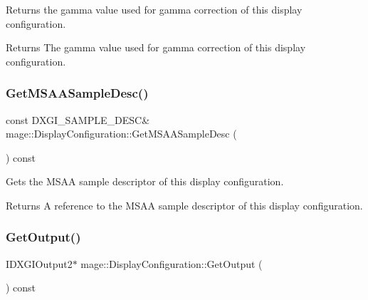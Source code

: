 Returns the gamma value used for gamma correction of this display configuration.

\begin{DoxyReturn}{Returns}
The gamma value used for gamma correction of this display configuration. 
\end{DoxyReturn}
\hypertarget{structmage_1_1_display_configuration_a254a0752dd6d1ec68121cd6495a10a02}{}\label{structmage_1_1_display_configuration_a254a0752dd6d1ec68121cd6495a10a02} 
\subsubsection{\texorpdfstring{Get\+M\+S\+A\+A\+Sample\+Desc()}{GetMSAASampleDesc()}}
{\footnotesize\ttfamily const D\+X\+G\+I\+\_\+\+S\+A\+M\+P\+L\+E\+\_\+\+D\+E\+SC\& mage\+::\+Display\+Configuration\+::\+Get\+M\+S\+A\+A\+Sample\+Desc (\begin{DoxyParamCaption}{ }\end{DoxyParamCaption}) const\hspace{0.3cm}{\ttfamily [noexcept]}}

Gets the M\+S\+AA sample descriptor of this display configuration.

\begin{DoxyReturn}{Returns}
A reference to the M\+S\+AA sample descriptor of this display configuration. 
\end{DoxyReturn}
\hypertarget{structmage_1_1_display_configuration_aa328570fbfc6456c0e5d90e738aec81b}{}\label{structmage_1_1_display_configuration_aa328570fbfc6456c0e5d90e738aec81b} 
\subsubsection{\texorpdfstring{Get\+Output()}{GetOutput()}}
{\footnotesize\ttfamily I\+D\+X\+G\+I\+Output2$\ast$ mage\+::\+Display\+Configuration\+::\+Get\+Output (\begin{DoxyParamCaption}{ }\end{DoxyParamCaption}) const\hspace{0.3cm}{\ttfamily [noexcept]}}

